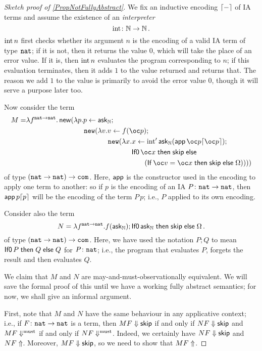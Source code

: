 \documentclass{article}
\begin{document}
\begin{proof}[Sketch proof of \ref{PropNotFullyAbstract}]
  We fix an inductive encoding $\lceil-\rceil$ of IA terms and assume the existence of an \emph{interpreter}
  \[
    \operatorname{int} \colon \mathbb{N} \to \mathbb{N}\,.
    \]
  $\operatorname{int} n$ first checks whether its argument $n$ is the encoding of a valid IA term of type ${\mathtt{nat}}$; if it is not, then it returns the value $0$, which will take the place of an error value.
  If it is, then $\operatorname{int} n$ evaluates the program corresponding to $n$; if this evaluation terminates, then it adds $1$ to the value returned and returns that.  
  The reason we add $1$ to the value is primarily to avoid the error value $0$, though it will serve a purpose later too.

  Now consider the term
  \setlength{\jot}{0pt}%
  \begin{align*}
    M=&\lambda f^{\nat \to \nat} .\neww(\lambda p.p\gets\ask_\bN;\\
      &\hspace{82pt}\new(\lambda v.v\gets f(\oc p);\\
        &\hspace{116pt}\new(\lambda x.x\gets \Int' \ask_\bN (\app \oc p \encode {\oc p});\\
          &\hspace{148pt}\IfO \oc x \Then \skipp \Else\\
            &\hspace{168pt}(\If \oc v = \oc x \Then \skipp \Else \Omega))))
  \end{align*}
  of type $({\mathtt{nat}}\to {\mathtt{nat}}) \to {\mathtt{com}}$.
  Here, $\operatorname{\mathsf{app}}$ is the constructor used in the encoding to apply one term to another: so if $p$ is the encoding of an IA $P\colon {\mathtt{nat}} \to {\mathtt{nat}}$, then $\operatorname{\mathsf{app}} p \lceil p\rceil$ will be the encoding of the term $P\,p$; i.e., $P$ applied to its own encoding.

  Consider also the term
  \[
    N = \lambda f^{{\mathtt{nat}} \to {\mathtt{nat}}}.f(\operatorname{{\mathsf{ask}}}_{\mathbb{N}});\operatorname{{\mathsf{If0}}} \operatorname{{\mathsf{ask}}}_{\mathbb{N}} \mathrel{\mathsf{then}} {\mathsf{skip}} \mathrel{\mathsf{else}} \Omega\,.
    \]
  of type $({\mathtt{nat}} \to {\mathtt{nat}}) \to {\mathtt{com}}$.  
  Here, we have used the notation $P;Q$ to mean $\operatorname{{\mathsf{If0}}} P \mathrel{\mathsf{then}} Q \mathrel{\mathsf{else}} Q$ for $P\colon {\mathtt{nat}}$; i.e., the program that evaluates $P$, forgets the result and then evaluates $Q$.

  We claim that $M$ and $N$ are may-and-must-observationally equivalent.  
  We will save the formal proof of this until we have a working fully abstract semantics; for now, we shall give an informal argument.  

  First, note that $M$ and $N$ have the same behaviour in any applicative context; i.e., if $F\colon {\mathtt{nat}} \to {\mathtt{nat}}$ is a term, then $MF\Downarrow {\mathsf{skip}}$ if and only if $NF\Downarrow{\mathsf{skip}}$ and $MF\Downarrow^{\text{must}}$ if and only if $NF\Downarrow^{\text{must}}$.  
  Indeed, we certainly have $NF\Downarrow{\mathsf{skip}}$ and $NF\Uparrow$.
  Moreover, $MF\Downarrow{\mathsf{skip}}$, so we need to show that $MF\Uparrow$.


\end{proof}
\end{document}
